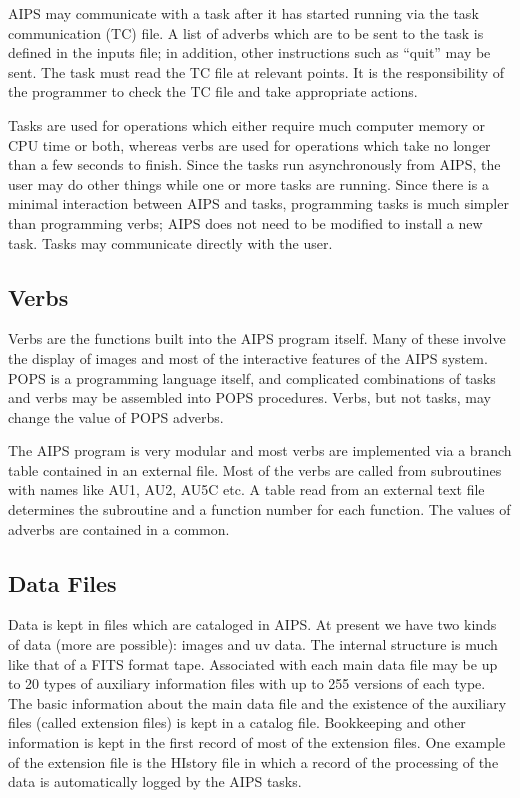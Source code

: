 AIPS may communicate with a task after it has started running via the
task communication (TC) file.  A list of adverbs which are to be sent
to the task is defined in the inputs file; in addition, other
instructions such as ``quit'' may be sent.  The task must read the TC
file at relevant points.  It is the responsibility of the programmer
to check the TC file and take appropriate actions.


Tasks are used for operations which either require much computer
memory or CPU time or both, whereas verbs are used for operations
which take no longer than a few seconds to finish.  Since the tasks
run asynchronously from AIPS, the user may  do other things while one
or more tasks are running.  Since there is a minimal interaction
between AIPS and tasks, programming tasks is much simpler than
programming verbs; AIPS does not need to be modified to install a new
task.  Tasks may communicate directly with the user.


\subsection{Verbs}
Verbs are the functions built into the AIPS program itself. Many of
these involve the display of images and most of the interactive
features of the AIPS system. POPS is a programming language itself,
and complicated combinations of tasks and verbs may be assembled into
POPS procedures.  Verbs, but not tasks, may change the value of POPS
adverbs.

The AIPS program is very modular and most verbs are implemented via a
branch table contained in an external file.  Most of the verbs are
called from subroutines with names like AU1, AU2, AU5C etc.  A table
read from an external text file determines the subroutine and a
function number for each function.  The values of adverbs are
contained in a common.


\subsection{Data Files}
Data is kept in files which are cataloged in AIPS.  At present we have
two kinds of data (more are possible): images and uv data. The
internal structure is much like that of a FITS format tape. Associated
with each main data file may be up to 20 types of auxiliary
information files with up to 255 versions of each type.  The basic
information about the main data file and the existence of the
auxiliary files (called extension files) is kept in a catalog file.
Bookkeeping and other information is kept in the first record of most
of the extension files.  One example of the extension file is the
HIstory file in which a record of the processing of the data is
automatically logged by the AIPS tasks.

